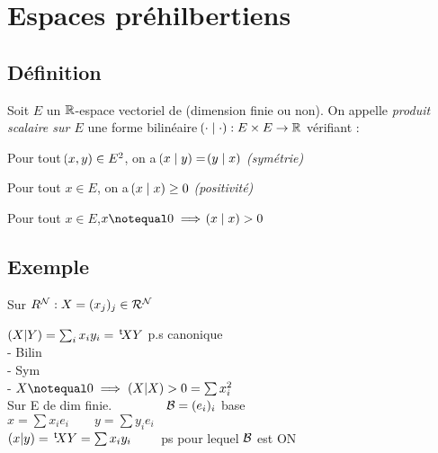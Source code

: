 \documentclass[a3paper,french,bookmarks]{article}
\begin{document}
    \renewcommand{\thesection}{\Roman{section}} 
    \renewcommand{\thesubsection}{\thesection.\Alph{subsection}}
    \renewcommand{\labelenumi}{\thesection.\arabic{enumi}.}
    \renewcommand*{\labelenumii}{\alph{enumii}.}
    \renewcommand*{\labelenumiii}{\alph{enumiii}.}
    
    \def\authorvar{DRISSI Rayan}

    
    
    \chaptertoc{}
    \section{Espaces préhilbertiens}
    
    \subsection{Définition}
    
    Soit $E$ un $\mathbb{R}$-espace vectoriel de (dimension finie ou non). On appelle \emph{produit scalaire sur $E$} une forme bilinéaire  $\!\left(\cdot \mid \cdot\right) : E \times E \to \mathbb{R}$ vérifiant :
    \begin{enumerate}
        \itast Pour tout $\!\left(x, y\right) \in E^2$, on a $\!\left(x \mid y\right) = \!\left(y \mid x\right)$ \qquad\emph{(symétrie)}
        
        \itast Pour tout $x \in E$, on a $\!\left(x \mid x\right) \geq 0$ \qquad\emph{(positivité)}
    
        \itast Pour tout $x \in E$,\qqua$x\notequal 0 \implies \p{x \mid x} > 0$  
    \end{enumerate}
    
    \subsection{Exemple}
    
    Sur $R^{\mathcal{N}}: X=(x_{j})_j \in \mathcal{R}^{\mathcal{N}}$

    
    $(X|Y) = \sum_{i} x_i y_i = \,{}^\mathsf{t}\!XY$ p.s canonique
    \\
    
    - Bilin \\
    - Sym \\
    - $X \notequal 0 \implies (X|X) > 0 = \sum x_i^2 $
    \\
    Sur E de dim finie. $\qquad \qquad \mathcal{B} = (e_i)_i$ base 
    \\
    $x = \sum x_i e_i \qquad y= \sum y_i e_i$
    \\
    $(x|y) = \,{}^\mathsf{t}\!XY = \sum x_i y_i \qquad$         ps pour lequel $\mathcal{B} $ est ON
    
\end{document}
